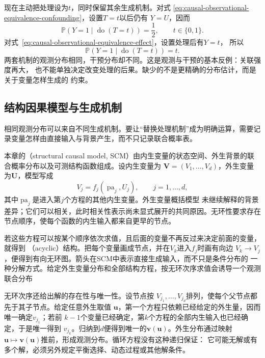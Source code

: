 现在主动把处理设为\(t\)，同时保留其余生成机制。对式
\eqref{eq:causal-observational-equivalence-confounding}，设置\(T=t\)以后仍有
\(Y=U\)，因而
\[
  \mathbb{P}(Y=1\mid \operatorname{do}(T=t))=\frac12,
  \qquad t\in\{0,1\}.
\]
对式~\eqref{eq:causal-observational-equivalence-effect}，设置处理后有\(Y=t\)，
所以
\[
  \mathbb{P}(Y=1\mid \operatorname{do}(T=t))=t.
\]
两套机制的观测分布相同，干预分布却不同。这是观测与干预的基本反例：关联强度再大，
也不能单独决定改变处理的后果。缺少的不是更精确的分布估计，而是关于变量怎样生成的
约束。

\subsection{结构因果模型与生成机制}

相同观测分布可以来自不同生成机制。要让“替换处理机制”成为明确运算，需要记录变量怎样由直接输入与背景产生，而不只记录联合概率表。
\begin{definition}[无环结构因果模型]
  \label{def:causal-structural-model}
  本章的（structural causal model, SCM）由内生变量的状态空间、外生背景的联合概率分布以及可测结构函数组成。设内生变量为
\(\bm{V}=(V_1,\ldots,V_d)\)，外生变量为\(\bm{U}\)，模型写成
\begin{equation}
  V_j=f_j(\operatorname{pa}_j,U_j),
  \qquad j=1,\ldots,d,
  \label{eq:causal-scm-definition}
\end{equation}
其中\(\operatorname{pa}_j\)是进入第\(j\)个方程的其他内生变量。外生变量概括模型
未继续解释的背景差异；它们可以相关，此时相关性表示尚未显式展开的共同原因。无环性要求存在节点顺序，使每个函数的内生输入都来自更早的节点。
\end{definition}

若这些方程可以按某个顺序依次求值，且后面的变量不再反过来决定前面的变量，就得到
（acyclic）结构。把每个变量画成节点，并在\(V_k\)进入\(f_j\)时画有向边
\(V_k\to V_j\)，便得到有向无环图。箭头在SCM中表示直接生成输入，而不只是条件分布的
一种分解方式。给定外生变量分布和全部结构方程，按无环次序求值会诱导一个观测联合分布

无环次序还给出解的存在性与唯一性。设节点按
\(V_{j_1},\ldots,V_{j_d}\)排列，使每个父节点都先于其子节点。给定任意外生取值
\(\bm{u}\)，第一个方程只依赖已经给定的外生量，因而唯一确定\(v_{j_1}\)；若前
\(k-1\)个变量已经确定，第\(k\)个方程的全部内生输入也已经确定，于是唯一得到
\(v_{j_k}\)。归纳到\(d\)便得到唯一的\(\bm{v}(\bm{u})\)。外生分布通过映射
\(\bm{u}\mapsto\bm{v}(\bm{u})\)推前，形成观测分布。循环方程没有这种递归保证：
它可能无解或有多个解，必须另外规定平衡选择、动态过程或其他解条件。

